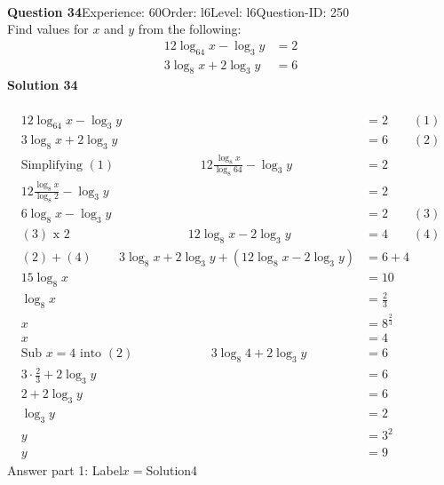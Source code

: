 \documentclass{article}
\begin{document}
\\[4pt]
\noindent\textbf{Question 34}\hspace{20pt}Experience: 60\hspace{20pt}Order: l6\hspace{20pt}Level: l6\hspace{20pt}Question-ID: 250\\[2pt]
Find values for $x$ and $y$ from the following:
\begin{align*}
12\log_{64}x-\log_{3}y&=2\\[2pt]
3\log_{8}x+2\log_{3}y&=6
\end{align*}
\noindent\textbf{Solution 34}\\[2pt]
\\[-35pt]\begin{align*}
12\log_{64}x-\log_{3}y&=2\qquad (1)\\[2pt]
3\log_{8}x+2\log_{3}y&=6\qquad (2)\\[2pt]
\text{Simplifying}\,\,(1)\hspace{83pt}12\displaystyle\frac{\log_{8}x}{\log_{8}64}-\log_{3}y&=2\\[2pt]
12\displaystyle\frac{\log_{8}x}{\log_{8}2}-\log_{3}y&=2\\[2pt]
6\log_{8}x-\log_{3}y&=2\qquad(3)\\[2pt]
(3)\,\,\text{x}\,\,2\hspace{114pt} 12\log_{8}x-2\log_{3}y&=4\qquad (4)\\[2pt]
(2)+(4)\hspace{26pt}3\log_{8}x+2\log_{3}y+(12\log_{8}x-2\log_{3}y)&=6+4\\[2pt]
15\log_{8}x&=10\\[2pt]
\log_{8}x&=\displaystyle\frac{2}{3}\\[2pt]
x&=8^{\frac{2}{3}}\\[2pt]
x&=4\\[12pt]
\text{Sub}\,\,x=4\,\,\text{into}\,\,(2)\hspace{75pt}3\log_{8}4+2\log_{3}y&=6\\[2pt]
3\!\cdot\!\frac{2}{3}+2\log_{3}y&=6\\[2pt]
2+2\log_{3}y&=6\\[2pt]
\log_{3}y&=2\\[2pt]
y&=3^2\\[2pt]
y&=9
\end{align*}
Answer part 1: \hspace{10pt}Label\hspace{10pt}$x=$\hspace{10pt}Solution\hspace{10pt}4\\
\end{document}
